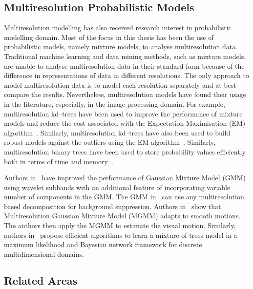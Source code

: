 \subsection*{Multiresolution Probabilistic Models}
\label{s:multiresProMdl}

Multiresolution modelling has also received research interest in 
probabilistic modelling domain. Most of the focus in this thesis
has been the use of probabilistic models, namely mixture models,
to analyse multiresolution  data. Traditional machine learning 
and data mining methods, such as mixture models, are unable to 
analyse  multiresolution data in their standard form because  
of the difference in representations of data in different  
resolutions.
The only approach to model multiresolution data is 
to model each resolution separately and at best compare the results.
Nevertheless, multiresolution models have found their usage in the 
literature, especially, in the image processing domain. 
For example, multi\-resolution kd--trees have been used to improve the performance 
of mixture models and reduce the cost associated with the Expectation 
Maximisation (EM) algorithm~\cite{moore99veryfast}. Similarly,
multiresolution kd--trees have also been used to build robust models
against the outliers using the EM algorithm~\cite{ng03robust}. 
Similarly, multiresolution binary trees have been used to store
probability values  efficiently both in terms of time and memory~\cite{bellot2003}.

Authors in~\cite{mukherjee13} have improved
the performance of Gaussian Mixture Model (GMM) using wavelet subbands
with an additional feature of incorporating variable number of
components in the GMM. The GMM in~\cite{mukherjee13} can use any 
multiresolution based decomposition for background suppression.
Authors in~\cite{wilson00} show that Multiresolution Gaussian Mixture 
Model (MGMM) adapts to smooth motions. The authors then apply the MGMM to 
estimate the visual motion. Similarly, authors in~\cite{meila2000} 
propose efficient algorithms to learn a mixture of trees model in 
a maximum likelihood and Bayesian network framework for discrete 
multidimensional domains. 


\subsection*{Related Areas}
\label{s:relatedAreas}

